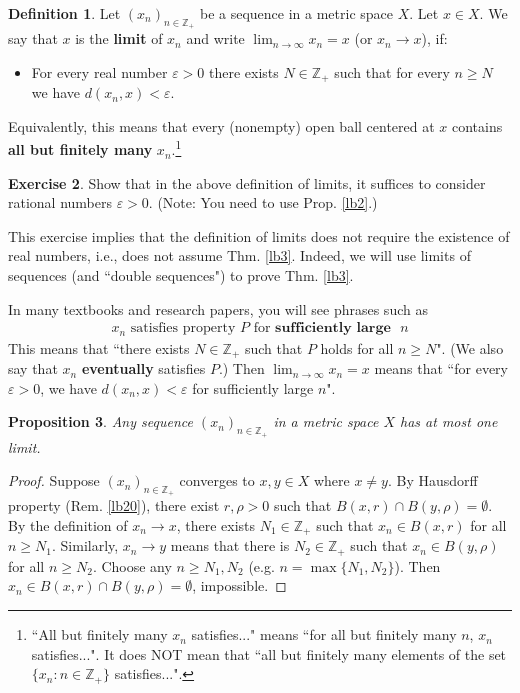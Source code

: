 \documentclass[12pt,b5paper,notitlepage]{article}
\theoremstyle{definition}
\newtheorem{df}{Definition}[section]
\newtheorem{exe}[df]{Exercise}
\theoremstyle{plain}
\newtheorem{pp}[df]{Proposition}
\newcommand{\Zbb}{\mathbb Z}
\numberwithin{equation}{section}
\begin{document}
\begin{df}
Let $(x_n)_{n\in\Zbb_+}$ be a sequence in a metric space $X$. Let $x\in X$. We say that $x$ is the \textbf{limit} of $x_n$ and write $\displaystyle\lim_{n\rightarrow\infty}x_n=x$ (or $x_n\rightarrow x$), if:
\begin{itemize}
\item For every real number $\varepsilon>0$ there exists $N\in\Zbb_+$ such that for every $n\geq N$ we have $d(x_n,x)<\varepsilon$. 
\end{itemize}
Equivalently, this means that every (nonempty) open ball centered at $x$ contains \textbf{all but finitely many}  $x_n$.\footnote{``All but finitely many $x_n$ satisfies..." means ``for all but finitely many $n$, $x_n$ satisfies...". It does NOT mean that ``all but finitely many elements of the set $\{x_n:n\in\Zbb_+\}$ satisfies...".} 
\end{df}

\begin{exe}
Show that in the above definition of limits,  it suffices to consider rational numbers $\varepsilon>0$. (Note: You need to use Prop. \ref{lb2}.) 
\end{exe}
This exercise implies that the definition of limits does not require the existence of real numbers, i.e., does not assume Thm. \ref{lb3}. Indeed, we will use limits of sequences (and ``double sequences") to prove Thm. \ref{lb3}.


In many textbooks and research papers, you will see phrases such as 
\begin{gather}
\text{$x_n$ satisfies property $P$ for } \textbf{sufficiently large} \text{ $n$}
\end{gather}
This means that ``there exists $N\in\Zbb_+$ such that $P$ holds for all $n\geq N$". (We also say that $x_n$ \textbf{eventually} satisfies $P$.) Then $\lim_{n\rightarrow\infty} x_n=x$ means that ``for every $\varepsilon>0$, we have $d(x_n,x)<\varepsilon$ for sufficiently large $n$". 

\begin{pp}\label{lb21}
Any sequence $(x_n)_{n\in\Zbb_+}$ in a metric space $X$ has at most one limit.
\end{pp}

\begin{proof}
Suppose $(x_n)_{n\in\Zbb_+}$ converges to $x,y\in X$ where $x\neq y$. By Hausdorff property (Rem. \ref{lb20}), there exist $r,\rho>0$ such that $B(x,r)\cap B(y,\rho)=\emptyset$. By the definition of $x_n\rightarrow x$, there exists $N_1\in\Zbb_+$ such that $x_n\in B(x,r)$ for all $n\geq N_1$. Similarly, $x_n\rightarrow y$ means that there is $N_2\in\Zbb_+$ such that $x_n\in B(y,\rho)$ for all $n\geq N_2$. Choose any $n\geq N_1,N_2$ (e.g. $n=\max\{N_1,N_2\}$). Then $x_n\in B(x,r)\cap B(y,\rho)=\emptyset$, impossible.
\end{proof}
\end{document}
